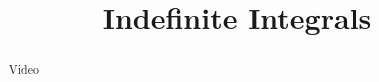 \documentclass[handout]{ximera}
\title{Indefinite Integrals}
\begin{document}
\begin{abstract} Video %
\end{abstract}

\maketitle

\end{document}
